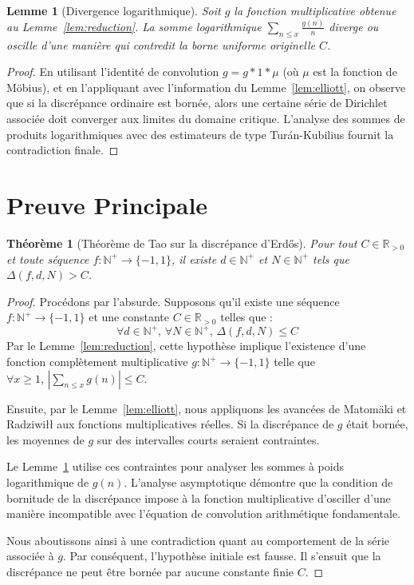 \documentclass[12pt,a4paper]{article}
\newtheorem{theorem}{Théorème}
\newtheorem{lemma}{Lemme}
\begin{document}
\begin{lemma}[Divergence logarithmique]
\label{lem:divergence}
Soit $g$ la fonction multiplicative obtenue au Lemme~\ref{lem:reduction}. La somme logarithmique $\sum_{n \leq x} \frac{g(n)}{n}$ diverge ou oscille d'une manière qui contredit la borne uniforme originelle $C$.
\end{lemma}
\begin{proof}
En utilisant l'identité de convolution $g = g \ast 1 \ast \mu$ (où $\mu$ est la fonction de Möbius), et en l'appliquant avec l'information du Lemme~\ref{lem:elliott}, on observe que si la discrépance ordinaire est bornée, alors une certaine série de Dirichlet associée doit converger aux limites du domaine critique. L'analyse des sommes de produits logarithmiques avec des estimateurs de type Turán-Kubilius fournit la contradiction finale.
\end{proof}

\section{Preuve Principale}

\begin{theorem}[Théorème de Tao sur la discrépance d'Erdős]
Pour tout $C \in \mathbb{R}_{>0}$ et toute séquence $f : \mathbb{N}^+ \to \{-1, 1\}$, il existe $d \in \mathbb{N}^+$ et $N \in \mathbb{N}^+$ tels que $\Delta(f, d, N) > C$.
\end{theorem}

\begin{proof}
Procédons par l'absurde. Supposons qu'il existe une séquence $f : \mathbb{N}^+ \to \{-1, 1\}$ et une constante $C \in \mathbb{R}_{>0}$ telles que :
\begin{equation}
\forall d \in \mathbb{N}^+, \, \forall N \in \mathbb{N}^+, \, \Delta(f, d, N) \leq C
\end{equation}
Par le Lemme~\ref{lem:reduction}, cette hypothèse implique l'existence d'une fonction complètement multiplicative $g : \mathbb{N}^+ \to \{-1, 1\}$ telle que $\forall x \geq 1, \, \left| \sum_{n \leq x} g(n) \right| \leq C$.

Ensuite, par le Lemme~\ref{lem:elliott}, nous appliquons les avancées de Matomäki et Radziwiłł aux fonctions multiplicatives réelles. Si la discrépance de $g$ était bornée, les moyennes de $g$ sur des intervalles courts seraient contraintes.

Le Lemme~\ref{lem:divergence} utilise ces contraintes pour analyser les sommes à poids logarithmique de $g(n)$. L'analyse asymptotique démontre que la condition de bornitude de la discrépance impose à la fonction multiplicative d'osciller d'une manière incompatible avec l'équation de convolution arithmétique fondamentale.

Nous aboutissons ainsi à une contradiction quant au comportement de la série associée à $g$. Par conséquent, l'hypothèse initiale est fausse. Il s'ensuit que la discrépance ne peut être bornée par aucune constante finie $C$.
\end{proof}
\end{document}
